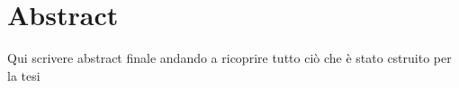 \section{Abstract}
Qui scrivere abstract finale andando a ricoprire tutto ciò che è stato cstruito per
la tesi\\